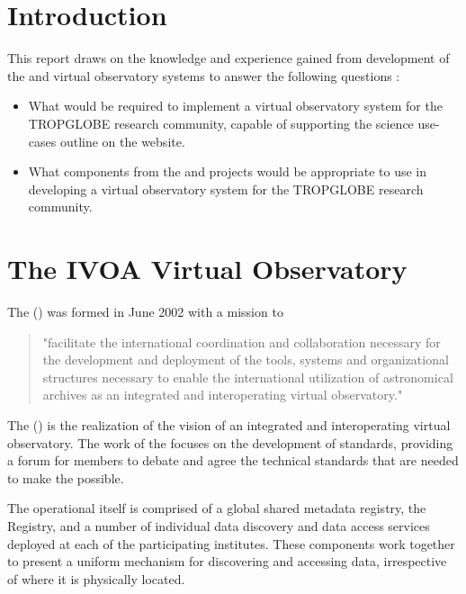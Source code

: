 \documentclass{article}
\begin{document}
\section{Introduction}

This report draws on the knowledge and experience gained from development of the
\cite{astro} and \cite{ivoa} virtual observatory systems to answer the following
questions :

\begin{itemize}
\item What would be required to implement a virtual observatory system for the
TROPGLOBE research community, capable of supporting the science use-cases outline
on the \cite{trop} website.

\item What components from the \cite{astro} and \cite{ivoa} projects would be
appropriate to use in developing a virtual observatory system for the TROPGLOBE
research community. 

\end{itemize}

\section{The IVOA Virtual Observatory}

The  (\cite{ivoa}) was formed in June 2002 with a mission to
\begin{quote}
"facilitate the international coordination and collaboration
necessary for the development and deployment of the tools, systems and
organizational structures necessary to enable the international utilization of
astronomical archives as an integrated and interoperating virtual observatory."
\end{quote}

The  (\cite{vo}) is the realization of the \cite{ivoa} vision of
an integrated and interoperating virtual observatory.
The work of the \cite{ivoa} focuses on the development of standards, providing a forum
for members to debate and agree the technical standards that are needed to make
the \cite{vo} possible.

The operational \cite{vo} itself is comprised of a global shared metadata registry,
the Registry, and a number of individual data discovery and data access services
deployed at each of the participating institutes.
These components work together to present a uniform mechanism for discovering
and accessing data, irrespective of where it is physically located.
\end{document}
